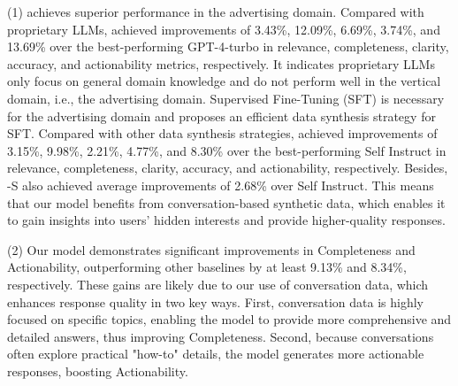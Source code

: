 (1) \ourmodel achieves superior performance in the advertising domain. Compared with proprietary LLMs, \ourmodel achieved improvements of 3.43\%, 12.09\%, 6.69\%, 3.74\%, and 13.69\% over the best-performing GPT-4-turbo in relevance, completeness, clarity, accuracy, and actionability metrics, respectively. It indicates proprietary LLMs only focus on general domain knowledge and do not perform well in the vertical domain, i.e., the advertising domain. Supervised Fine-Tuning (SFT) is necessary for the advertising domain and \ourmodel proposes an efficient data synthesis strategy for SFT.
Compared with other data synthesis strategies, \ourmodel achieved improvements of 3.15\%, 9.98\%, 2.21\%, 4.77\%, and 8.30\% over the best-performing Self Instruct in relevance, completeness, clarity, accuracy, and actionability, respectively. Besides, \ourmodel-S also achieved average improvements of 2.68\% over Self Instruct. This means that our model benefits from conversation-based synthetic data, which enables it to gain insights into users' hidden interests and provide higher-quality responses.


(2) Our model demonstrates significant improvements in Completeness and Actionability, outperforming other baselines by at least 9.13\% and 8.34\%, respectively. These gains are likely due to our use of conversation data, which enhances response quality in two key ways. First, conversation data is highly focused on specific topics, enabling the model to provide more comprehensive and detailed answers, thus improving Completeness. Second, because conversations often explore practical "how-to" details, the model generates more actionable responses, boosting Actionability. 

